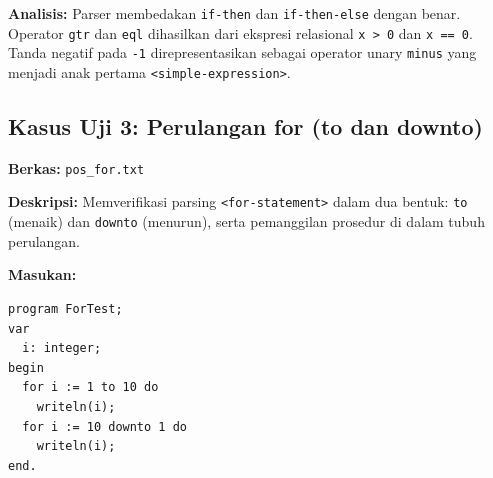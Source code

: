 \documentclass[12pt,a4paper]{article}
\begin{document}
\textbf{Analisis:} Parser membedakan \texttt{if-then} dan \texttt{if-then-else} dengan benar. Operator \texttt{gtr} dan \texttt{eql} dihasilkan dari ekspresi relasional \texttt{x > 0} dan \texttt{x == 0}. Tanda negatif pada \texttt{-1} direpresentasikan sebagai operator unary \texttt{minus} yang menjadi anak pertama \texttt{<simple-expression>}.

\subsection{Kasus Uji 3: Perulangan for (to dan downto)}
\textbf{Berkas:} \texttt{pos\_for.txt}

\textbf{Deskripsi:} Memverifikasi parsing \texttt{<for-statement>} dalam dua bentuk: \texttt{to} (menaik) dan \texttt{downto} (menurun), serta pemanggilan prosedur di dalam tubuh perulangan.

\textbf{Masukan:}
\begin{lstlisting}[style=default]
program ForTest;
var
  i: integer;
begin
  for i := 1 to 10 do
    writeln(i);
  for i := 10 downto 1 do
    writeln(i);
end.
\end{lstlisting}
\end{document}
